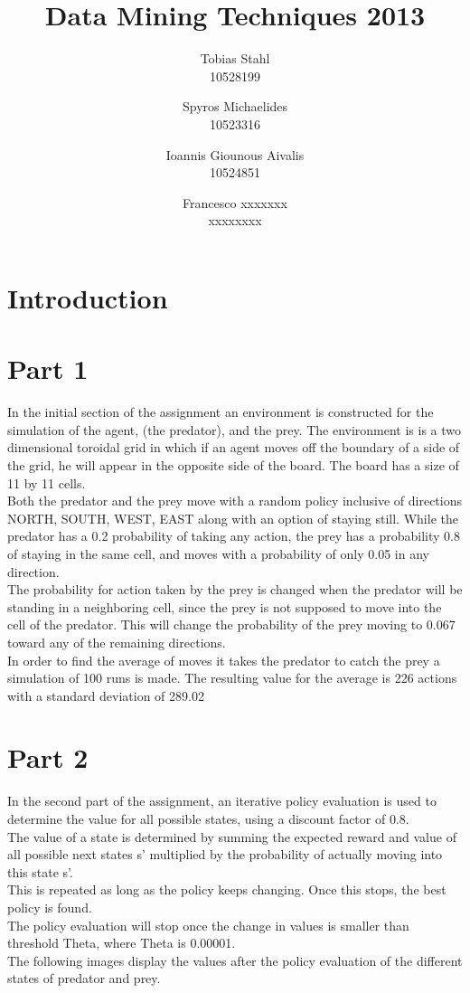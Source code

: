 \documentclass[11pt]{article}
\title{
	\textbf{Data Mining Techniques 2013}
}
\author{Tobias Stahl \\ 10528199 \and Spyros Michaelides \\ 10523316 \and Ioannis Giounous Aivalis \\ 10524851 \and Francesco xxxxxxx \\ xxxxxxxx}
\date{}
\begin{document}
\maketitle

\section{Introduction}



\section{Part 1}

In the initial section of the assignment an environment is constructed for the simulation of the agent, (the predator), and the prey. The environment is is a two dimensional toroidal grid in which if an agent moves off the boundary of a side of the grid, he will appear in the opposite side of the board. The board has a size of 11 by 11 cells.\\
Both the predator and the prey move with a random policy inclusive of directions NORTH, SOUTH, WEST, EAST along with an option of staying still. While the predator has a 0.2 probability of taking any action, the prey has a probability 0.8 of staying in the same cell, and moves with a probability of only 0.05 in any direction.\\
The probability for action taken by the prey is changed when the predator will be standing in a neighboring cell, since the prey is not supposed to move into the cell of the predator. This will change the probability of the prey moving to 0.067 toward any of the remaining directions.\\
In order to find the average of moves it takes the predator to catch the prey a simulation of 100 runs is made. The resulting value for the average is 226 actions with a standard deviation of 289.02



\section{Part 2}

In the second part of the assignment, an iterative policy evaluation is used to determine the value for all possible states, using a discount factor of 0.8.\\
The value of a state is determined by summing the expected reward and value of all possible next states s' multiplied by the probability of actually moving into this state s'.\\
This is repeated as long as the policy keeps changing. Once this stops, the best policy is found.\\
The policy evaluation will stop once the change in values is smaller than threshold Theta, where Theta is 0.00001.\\
The following images display the values after the policy evaluation of the different states of predator and prey.
\end{document}
